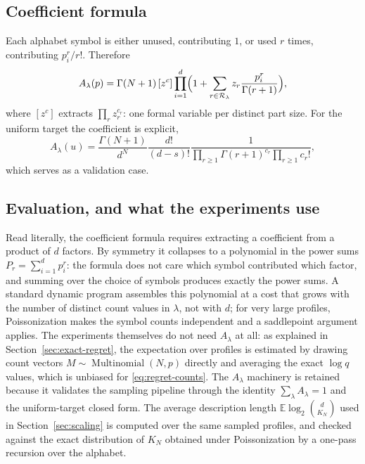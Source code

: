 \documentclass[11pt]{article}
\newcommand{\E}{\mathbb{E}}
\newcommand{\Nseq}{N}
\begin{document}
\subsection{Coefficient formula}
Each alphabet symbol is either unused, contributing \(1\), or used \(r\)
times, contributing \(p_i^r/r!\).  Therefore
\[
  A_\lambda(p)
  =
  \Gamma(\Nseq+1)\,
  [z^c]\prod_{i=1}^d
  \Bigl(
    1+\sum_{r\in\mathcal R_\lambda}
      z_r\frac{p_i^r}{\Gamma(r+1)}
  \Bigr),
\]
where \([z^c]\) extracts \(\prod_{r}z_r^{c_r}\): one formal variable per
distinct part size.  For the uniform target the coefficient is explicit,
\[
  A_\lambda(u)
  =
  \frac{\Gamma(\Nseq+1)}{d^\Nseq}
  \frac{d!}{(d-s)!}
  \frac{1}{\prod_{r\ge1}\Gamma(r+1)^{c_r}\prod_{r\ge1}c_r!},
\]
which serves as a validation case.

\subsection{Evaluation, and what the experiments use}
\label{sec:app-alambda-methods}
Read literally, the coefficient formula requires extracting a coefficient
from a product of \(d\) factors.  By symmetry it collapses to a polynomial
in the power sums \(P_r=\sum_{i=1}^d p_i^r\): the formula does not care
which symbol contributed which factor, and summing over the choice of
symbols produces exactly the power sums.  A standard dynamic program
assembles this polynomial at a cost that grows with the number of distinct
count values in \(\lambda\), not with \(d\); for very large profiles,
Poissonization makes the symbol counts independent and a saddlepoint
argument applies.  The experiments themselves do not need \(A_\lambda\) at
all: as explained in Section~\ref{sec:exact-regret}, the expectation over
profiles is estimated by drawing count vectors
\(M\sim\operatorname{Multinomial}(\Nseq,p)\) directly and averaging the
exact \(\log q\) values, which is unbiased for \eqref{eq:regret-counts}.
The \(A_\lambda\) machinery is retained because it validates the sampling
pipeline through the identity \(\sum_\lambda A_\lambda=1\) and the
uniform-target closed form.  The average description length
\(\E\log_2\binom{d}{K_N}\) used in Section~\ref{sec:scaling} is computed
over the same sampled profiles, and checked against the exact distribution
of \(K_N\) obtained under Poissonization by a one-pass recursion over the
alphabet.
\end{document}
